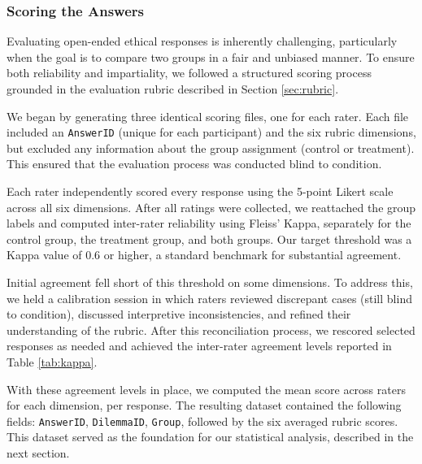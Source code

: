 \subsubsection{Scoring the Answers}
\label{sec:scoring}

Evaluating open-ended ethical responses is inherently challenging, particularly when the goal is to compare two groups in a fair and unbiased manner. To ensure both reliability and impartiality, we followed a structured scoring process grounded in the evaluation rubric described in Section \ref{sec:rubric}.

We began by generating three identical scoring files, one for each rater. Each file included an \texttt{AnswerID} (unique for each participant) and the six rubric dimensions, but excluded any information about the group assignment (control or treatment). This ensured that the evaluation process was conducted blind to condition.

Each rater independently scored every response using the 5-point Likert scale across all six dimensions. After all ratings were collected, we reattached the group labels and computed inter-rater reliability using Fleiss' Kappa, separately for the control group, the treatment group, and both groups. Our target threshold was a Kappa value of 0.6 or higher, a standard benchmark for substantial agreement.

Initial agreement fell short of this threshold on some dimensions. To address this, we held a calibration session in which raters reviewed discrepant cases (still blind to condition), discussed interpretive inconsistencies, and refined their understanding of the rubric. After this reconciliation process, we rescored selected responses as needed and achieved the inter-rater agreement levels reported in Table \ref{tab:kappa}.

\begin{table}[H]
  \centering
  \caption{Fleiss' Kappa Scores by Dimension and Group}
  \label{tab:kappa}
\end{table}

With these agreement levels in place, we computed the mean score across raters for each dimension, per response. The resulting dataset contained the following fields: \texttt{AnswerID}, \texttt{DilemmaID}, \texttt{Group}, followed by the six averaged rubric scores. This dataset served as the foundation for our statistical analysis, described in the next section.
